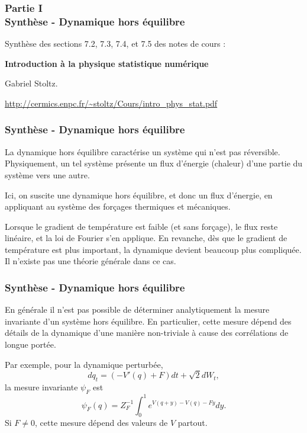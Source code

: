 \begin{frame}

    \frametitle{Partie I \\
        Synthèse - Dynamique hors équilibre}

    Synthèse des sections 7.2, 7.3, 7.4, et 7.5 des notes de cours :

    \textbf{Introduction à la physique statistique numérique}
    \cite{stoltz_phys_stat}

    Gabriel Stoltz.

    \small \url{http://cermics.enpc.fr/~stoltz/Cours/intro_phys_stat.pdf}

\end{frame}

\begin{frame}

    \frametitle{Synthèse - Dynamique hors équilibre}

    La dynamique hors équilibre caractérise un système qui n'est pas
    réversible. Physiquement, un tel système présente un flux d'énergie
    (chaleur) d'une partie du système vers une autre.

    Ici, on suscite une dynamique hors équilibre, et donc un flux
    d'énergie, en appliquant au système des forçages thermiques et
    mécaniques.

    Lorsque le gradient de température est faible (et sans forçage),
    le flux reste linéaire, et la loi de Fourier s'en applique. En
    revanche, dès que le gradient de température est plus important,
    la dynamique devient beaucoup plus compliquée. Il n'existe pas
    une théorie générale dans ce cas.

\end{frame}

\begin{frame}

    \frametitle{Synthèse - Dynamique hors équilibre}

    En générale il n'est pas possible de déterminer analytiquement
    la mesure invariante d'un système hors équilibre. En particulier,
    cette mesure dépend des détails de la dynamique d'une manière
    non-triviale à cause des corrélations de longue portée.

    Par exemple, pour la dynamique perturbée,
    \[dq_t = (-V'(q) + F)dt + \sqrt{2} dW_t,\]
    la mesure invariante $\psi_F$ est
    \[\psi_F(q) = Z_F^{-1} \int_0^1 e^{V(q+y) - V(q) -Fy} dy.\]
    Si $F \neq 0$, cette mesure dépend des valeurs de $V$ partout.

\end{frame}



